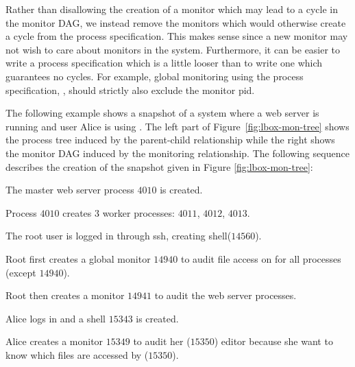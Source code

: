 Rather than disallowing the creation of a monitor which may lead to a cycle
in the monitor DAG, we instead remove the monitors which would otherwise
create a cycle from the process specification.
This makes sense since a new monitor may not wish to care about monitors
in the system. Furthermore, it can be easier to write a process specification
which is a little looser than to write one which guarantees no cycles.
For example, global monitoring using the process specification, ,
should strictly also exclude the monitor pid.


The following example shows a snapshot of a system where a web server is running
and user Alice is using .
The left part of Figure~\ref{fig:lbox-mon-tree} shows the process tree induced
by the parent-child relationship while the right
shows the monitor DAG induced by the monitoring relationship.
The following sequence describes the creation of the snapshot given
in Figure \ref{fig:lbox-mon-tree}:

\begin{tightenumerate}
\item The master web server process $4010$ is created.
\item Process $4010$ creates 3 worker processes:
$4011$, $4012$, $4013$.
\item The root user is logged in through ssh, creating shell($14560$).
\item Root first creates a global monitor $14940$ to audit
file access on  for all processes (except $14940$).
\item Root then creates a monitor $14941$ to audit the web server processes.
\item Alice logs in and a shell $15343$ is created.
\item Alice creates a monitor $15349$ to audit her ($15350$) editor
because she want to know which files are accessed by ($15350$).
\end{tightenumerate}

